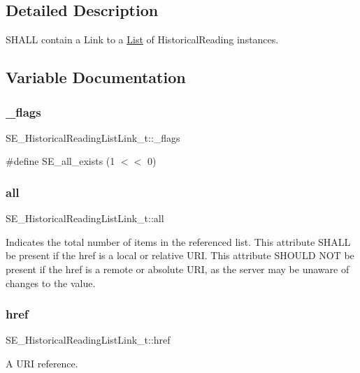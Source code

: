 \subsection{Detailed Description}
S\+H\+A\+LL contain a Link to a \hyperlink{structList}{List} of Historical\+Reading instances. 

\subsection{Variable Documentation}
\mbox{\label{group__HistoricalReadingListLink_ga6a915ba35644446ae6a70f7eec8aa2c4}} 
\subsubsection{\texorpdfstring{\+\_\+flags}{\_flags}}
{\footnotesize\ttfamily S\+E\+\_\+\+Historical\+Reading\+List\+Link\+\_\+t\+::\+\_\+flags}

\#define S\+E\+\_\+all\+\_\+exists (1 $<$$<$ 0) \mbox{\label{group__HistoricalReadingListLink_gaad484f3ec067fe1449f8cdc87af67ee0}} 
\subsubsection{\texorpdfstring{all}{all}}
{\footnotesize\ttfamily S\+E\+\_\+\+Historical\+Reading\+List\+Link\+\_\+t\+::all}

Indicates the total number of items in the referenced list. This attribute S\+H\+A\+LL be present if the href is a local or relative U\+RI. This attribute S\+H\+O\+U\+LD N\+OT be present if the href is a remote or absolute U\+RI, as the server may be unaware of changes to the value. \mbox{\label{group__HistoricalReadingListLink_gaec0f08b36bb8f6e6f61a4aa74bd1bbcb}} 
\subsubsection{\texorpdfstring{href}{href}}
{\footnotesize\ttfamily S\+E\+\_\+\+Historical\+Reading\+List\+Link\+\_\+t\+::href}

A U\+RI reference. 